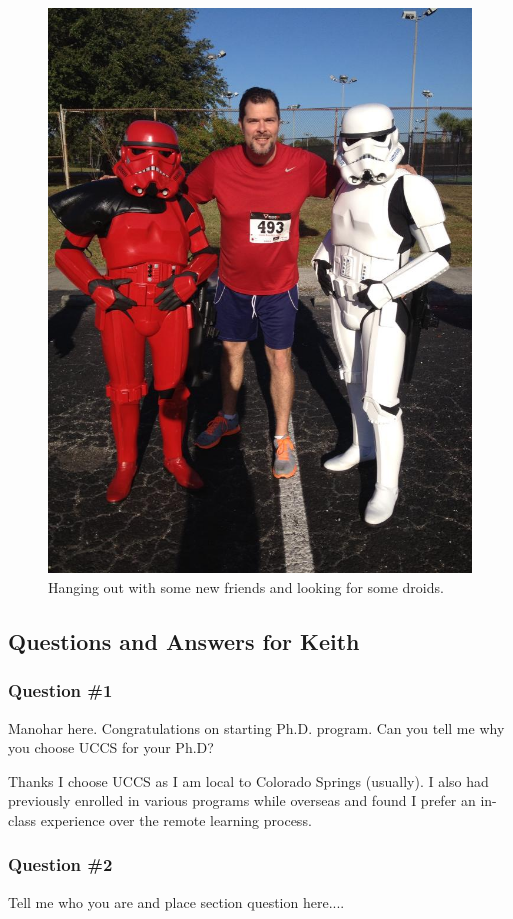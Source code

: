 \begin{figure}
	\centering
	\caption{Hanging out with some new friends and looking for some droids.}
	\label{fig:PaulsonLittleTall}
	\includegraphics[width=0.7\linewidth]{PaulsonLittleTall}
\end{figure}

    \subsection{Questions and Answers for Keith}
    \subsubsection {Question \#1}
		Manohar here. Congratulations on starting Ph.D. program. Can you tell me why you choose UCCS for your Ph.D?
		
		Thanks I choose UCCS as I am local to Colorado Springs (usually). I also had previously enrolled in various programs while overseas and found I prefer an in-class experience over the remote learning process. 

    \subsubsection {Question \#2}

	  Tell me who you are and place section question here....